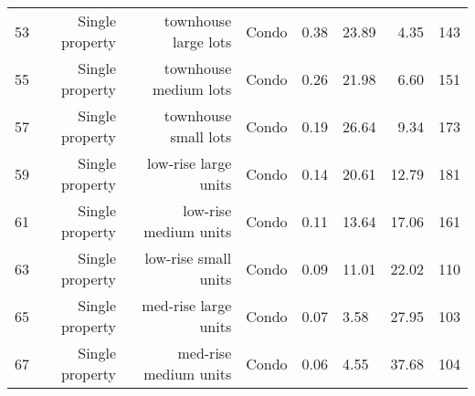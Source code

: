 \begin{tabular}{ p{0.5in} r r p{1in} p{0.75in} p{0.75in} rr}
        53 & Single property & townhouse large lots & Condo &       0.38 &      23.89 &       4.35 &        143 \\

        55 & Single property & townhouse medium lots & Condo &       0.26 &      21.98 &       6.60 &        151 \\

        57 & Single property & townhouse small lots & Condo &       0.19 &      26.64 &       9.34 &        173 \\

        59 & Single property & low-rise large units & Condo &       0.14 &      20.61 &      12.79 &        181 \\

        61 & Single property & low-rise medium units & Condo &       0.11 &      13.64 &      17.06 &        161 \\

        63 & Single property & low-rise small units & Condo &       0.09 &      11.01 &      22.02 &        110 \\

        65 & Single property & med-rise large units & Condo &       0.07 &       3.58 &      27.95 &        103 \\

        67 & Single property & med-rise medium units & Condo &       0.06 &       4.55 &      37.68 &        104 \\








\end{tabular}
